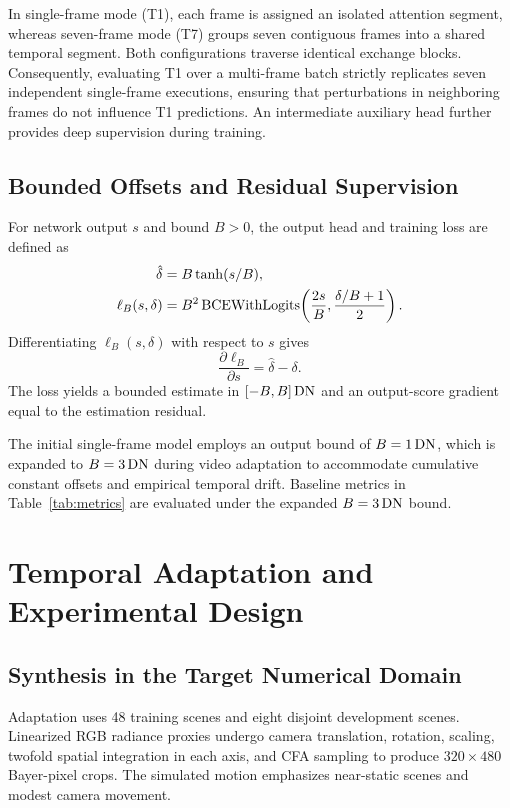 In single-frame mode (T1), each frame is assigned an isolated attention segment, whereas seven-frame mode (T7) groups seven contiguous frames into a shared temporal segment. Both configurations traverse identical exchange blocks. Consequently, evaluating T1 over a multi-frame batch strictly replicates seven independent single-frame executions, ensuring that perturbations in neighboring frames do not influence T1 predictions. An intermediate auxiliary head further provides deep supervision during training.

\subsection{Bounded Offsets and Residual Supervision}
For network output $s$ and bound $B>0$, the output head and training loss are defined as
\begin{align}
 \hat\delta&=B\tanh(s/B),\label{eq:head}\\
 \ell_B(s,\delta)&=B^2\operatorname{BCEWithLogits}\!\left(\frac{2s}{B},\frac{\delta/B+1}{2}\right).
 \label{eq:loss}
\end{align}
Differentiating $\ell_B(s,\delta)$ with respect to $s$ gives
\begin{equation}
 \frac{\partial\ell_B}{\partial s}=\hat\delta-\delta.
 \label{eq:gradient}
\end{equation}
The loss yields a bounded estimate in $[-B,B]\,\mathrm{DN}$ and an output-score gradient equal to the estimation residual.

The initial single-frame model employs an output bound of $B=1\,\mathrm{DN}$, which is expanded to $B=3\,\mathrm{DN}$ during video adaptation to accommodate cumulative constant offsets and empirical temporal drift. Baseline metrics in Table~\ref{tab:metrics} are evaluated under the expanded $B=3\,\mathrm{DN}$ bound.


\section{Temporal Adaptation and Experimental Design}
\label{sec:adapt}

\subsection{Synthesis in the Target Numerical Domain}
Adaptation uses 48 training scenes and eight disjoint development scenes. Linearized RGB radiance proxies undergo camera translation, rotation, scaling, twofold spatial integration in each axis, and CFA sampling to produce $320\times480$ Bayer-pixel crops. The simulated motion emphasizes near-static scenes and modest camera movement.

